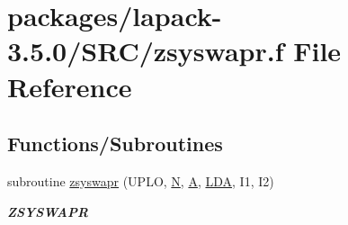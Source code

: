 \hypertarget{zsyswapr_8f}{}\section{packages/lapack-\/3.5.0/\+S\+R\+C/zsyswapr.f File Reference}
\label{zsyswapr_8f}
\subsection*{Functions/\+Subroutines}
\begin{DoxyCompactItemize}
\item 
subroutine \hyperlink{group__complex16SYauxiliary_ga36d9ec6db6e6dda43c30a8727ae0d6ae}{zsyswapr} (U\+P\+L\+O, \hyperlink{polmisc_8c_a0240ac851181b84ac374872dc5434ee4}{N}, \hyperlink{classA}{A}, \hyperlink{example__user_8c_ae946da542ce0db94dced19b2ecefd1aa}{L\+D\+A}, I1, I2)
\begin{DoxyCompactList}\small\item\em {\bfseries Z\+S\+Y\+S\+W\+A\+P\+R} \end{DoxyCompactList}\end{DoxyCompactItemize}
